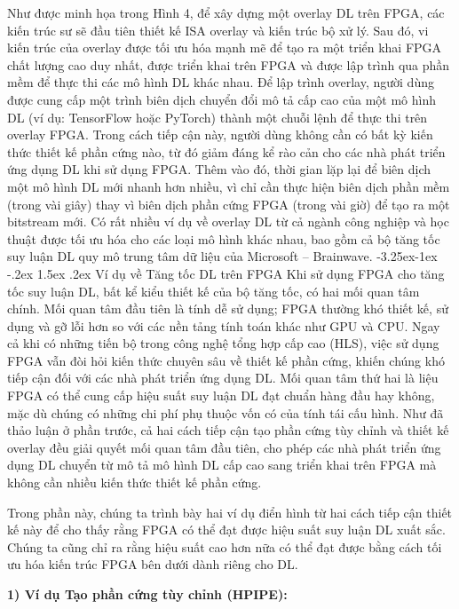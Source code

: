 \documentclass[a4paper]{article}
\makeatletter
\newcounter {subsubsubsection}[subsubsection]
\newcommand\subsubsubsection{\@startsection{subsubsubsection}{4}{\z@}%
                                     {-3.25ex\@plus -1ex \@minus -.2ex}%
                                     {1.5ex \@plus .2ex}%
                                     {\normalfont\normalsize\bfseries}}
\makeatother
\begin{document}
    Như được minh họa trong Hình 4, để xây dựng một overlay DL trên FPGA, các kiến trúc sư sẽ đầu tiên thiết kế ISA overlay và kiến trúc bộ xử lý. Sau đó, vi kiến trúc của overlay được tối ưu hóa mạnh mẽ để tạo ra một triển khai FPGA chất lượng cao duy nhất, được triển khai trên FPGA và được lập trình qua phần mềm để thực thi các mô hình DL khác nhau. Để lập trình overlay, người dùng được cung cấp một trình biên dịch chuyển đổi mô tả cấp cao của một mô hình DL (ví dụ: TensorFlow hoặc PyTorch) thành một chuỗi lệnh để thực thi trên overlay FPGA. Trong cách tiếp cận này, người dùng không cần có bất kỳ kiến thức thiết kế phần cứng nào, từ đó giảm đáng kể rào cản cho các nhà phát triển ứng dụng DL khi sử dụng FPGA. Thêm vào đó, thời gian lặp lại để biên dịch một mô hình DL mới nhanh hơn nhiều, vì chỉ cần thực hiện biên dịch phần mềm (trong vài giây) thay vì biên dịch phần cứng FPGA (trong vài giờ) để tạo ra một bitstream mới. Có rất nhiều ví dụ về overlay DL từ cả ngành công nghiệp và học thuật được tối ưu hóa cho các loại mô hình khác nhau, bao gồm cả bộ tăng tốc suy luận DL quy mô trung tâm dữ liệu của Microsoft – Brainwave.
\subsubsubsection{Ví dụ về Tăng tốc DL trên FPGA}
    Khi sử dụng FPGA cho tăng tốc suy luận DL, bất kể kiểu thiết kế của bộ tăng tốc, có hai mối quan tâm chính. Mối quan tâm đầu tiên là tính dễ sử dụng; FPGA thường khó thiết kế, sử dụng và gỡ lỗi hơn so với các nền tảng tính toán khác như GPU và CPU. Ngay cả khi có những tiến bộ trong công nghệ tổng hợp cấp cao (HLS), việc sử dụng FPGA vẫn đòi hỏi kiến thức chuyên sâu về thiết kế phần cứng, khiến chúng khó tiếp cận đối với các nhà phát triển ứng dụng DL. Mối quan tâm thứ hai là liệu FPGA có thể cung cấp hiệu suất suy luận DL đạt chuẩn hàng đầu hay không, mặc dù chúng có những chi phí phụ thuộc vốn có của tính tái cấu hình. Như đã thảo luận ở phần trước, cả hai cách tiếp cận tạo phần cứng tùy chỉnh và thiết kế overlay đều giải quyết mối quan tâm đầu tiên, cho phép các nhà phát triển ứng dụng DL chuyển từ mô tả mô hình DL cấp cao sang triển khai trên FPGA mà không cần nhiều kiến thức thiết kế phần cứng.

Trong phần này, chúng ta trình bày hai ví dụ điển hình từ hai cách tiếp cận thiết kế này để cho thấy rằng FPGA có thể đạt được hiệu suất suy luận DL xuất sắc. Chúng ta cũng chỉ ra rằng hiệu suất cao hơn nữa có thể đạt được bằng cách tối ưu hóa kiến trúc FPGA bên dưới dành riêng cho DL.

\textbf{1) Ví dụ Tạo phần cứng tùy chỉnh (HPIPE):}
\end{document}

